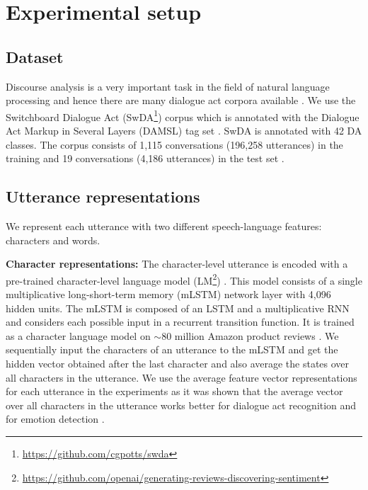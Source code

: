 \documentclass[a4paper]{article}
\begin{document}
\section{Experimental setup}

\subsection{Dataset}

Discourse analysis is a very important task in the field of natural language processing and hence there are many dialogue act corpora available \cite{serban2015survey}. We use the Switchboard Dialogue Act (SwDA\footnote{\url{https://github.com/cgpotts/swda}}) corpus which is annotated with the Dialogue Act Markup in Several Layers (DAMSL) tag set \cite{godfrey1992switchboard,shribergSwitch}. SwDA is annotated with 42 DA classes. 
The corpus consists of 1,115 conversations (196,258 utterances) in the training and 19 conversations (4,186 utterances) in the test set \cite{stolcke2000dialogue,kalchbrenner2013recurrent}.

\subsection{Utterance representations}
\label{sec:utt_rep}

We represent each utterance with two different speech-language features: characters and words. 

\textbf{Character representations:} The character-level utterance is encoded with a pre-trained character-level language model (LM\footnote{\url{https://github.com/openai/generating-reviews-discovering-sentiment}}) \cite{Radford2017LearningSentiment}. 
This model consists of a single multiplicative long-short-term memory (mLSTM) network \cite{krause2016multiplicative} layer with 4,096 hidden units. 
The mLSTM is composed of an LSTM and a multiplicative RNN and considers each possible input in a recurrent transition function.
It is trained as a character language model on $\sim$80 million Amazon product reviews \cite{Radford2017LearningSentiment}.
We sequentially input the characters of an utterance to the mLSTM and get the hidden vector obtained after the last character and also average the states over all characters in the utterance.
We use the average feature vector representations for each utterance in the experiments as it was shown that the average vector over all characters in the utterance works better for dialogue act recognition \cite{BOTHE18_525} and for emotion detection \cite{labothe2017WASSA2017}. 
\end{document}
